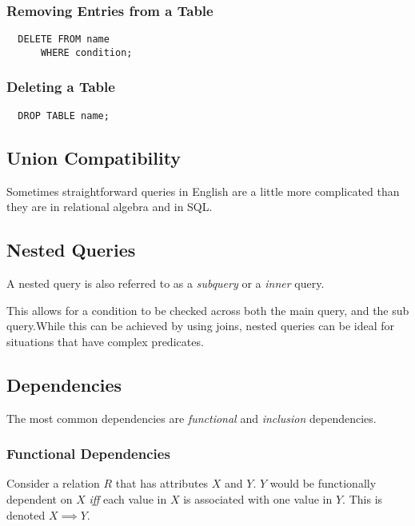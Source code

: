 \documentclass{article}
\begin{document}
\subsubsection{Removing Entries from a Table}

\begin{lstlisting}
  DELETE FROM name
      WHERE condition;
\end{lstlisting}

\subsubsection{Deleting a Table}

\begin{lstlisting}
  DROP TABLE name;
\end{lstlisting}


\subsection{Union Compatibility}

Sometimes straightforward queries in English are a little more complicated than they are in relational algebra and in SQL. 

\subsection{Nested Queries}

A nested query is also referred to as a \textit{subquery} or a \textit{inner} query.

This allows for a condition to be checked across both the main query, and the sub query.While this can be achieved by using joins, nested queries can be ideal for situations that have complex predicates.

\subsection{Dependencies}

The most common dependencies are \textit{functional} and \textit{inclusion} dependencies.

\subsubsection{Functional Dependencies}

Consider a relation $R$ that has attributes $X$ and $Y$. $Y$ would be functionally dependent on $X$ \textit{iff} each value in $X$ is associated with one value in $Y$. This is denoted $X \implies Y$.
\end{document}
